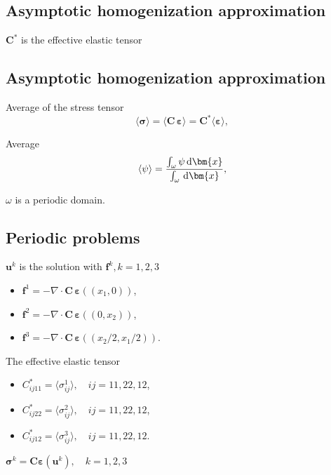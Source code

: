 \documentclass[compress,pdf,mathserif]{beamer}
\begin{document}
\subsection{Asymptotic homogenization approximation}
\begin{frame}
    \centering
    
    \centering
    \vspace{1em}
    $\bm{C}^*$ is the effective elastic tensor
\end{frame}

\subsection{Asymptotic homogenization approximation}
\begin{frame}
\centering
Average of the stress tensor
\[
\langle \bm{\sigma} \rangle = \langle \bm{C}\, \bm{\varepsilon} \rangle = \bm{C}^* \langle \bm{\varepsilon}\rangle,
\]

Average
\[
\langle\psi\rangle = \frac{\int_\omega \psi \, {\rm d}\bm{x}}{\int_\omega \, {\rm d}\bm{x}},
\]

$\omega$ is a periodic domain.
\end{frame}

\subsection{Periodic problems}
\begin{frame}
    \centering
    $\bm{u}^k$ is the solution with $\bm{f}^k, k=1,2,3$
    \begin{itemize}
        \item $\bm{f}^1 = -\nabla \cdot \bm{C}\, \bm{\varepsilon}((x_1, 0))$,
        \item $\bm{f}^2 = -\nabla \cdot \bm{C}\, \bm{\varepsilon}((0, x_2))$,
        \item $\bm{f}^3 = -\nabla \cdot \bm{C}\, \bm{\varepsilon}((x_2/2, x_1/2))$.
    \end{itemize}
\vspace{1em}

    The effective elastic tensor
    \begin{itemize}
        \item $C^*_{ij11} = \langle \sigma_{ij}^1 \rangle, \quad ij=11, 22, 12$,
        \item $C^*_{ij22} = \langle \sigma_{ij}^2 \rangle, \quad ij=11, 22, 12$,
        \item $C^*_{ij12} = \langle \sigma_{ij}^3 \rangle, \quad ij=11, 22, 12$.
    \end{itemize}

    $\bm{\sigma}^k=\bm{C}\bm{\varepsilon}(\bm{u}^k),\quad k=1,2,3$
\end{frame}
\end{document}
